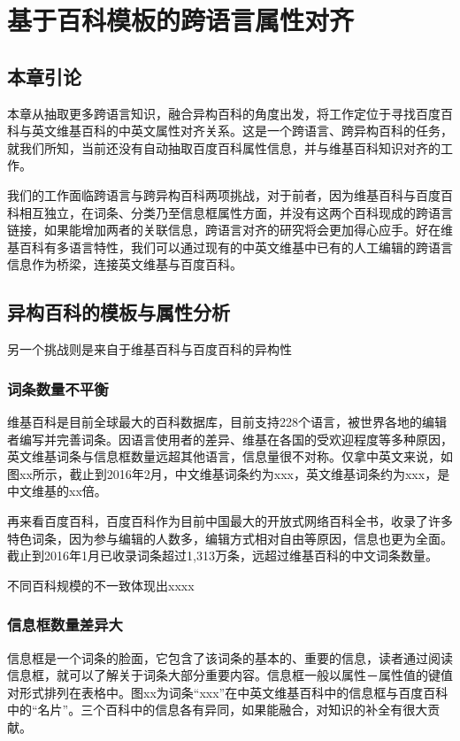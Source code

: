 \chapter{基于百科模板的跨语言属性对齐}
\label{cha:intro}

\section{本章引论}
本章从抽取更多跨语言知识，融合异构百科的角度出发，将工作定位于寻找百度百科与英文维基百科的中英文属性对齐关系。这是一个跨语言、跨异构百科的任务，就我们所知，当前还没有自动抽取百度百科属性信息，并与维基百科知识对齐的工作。

我们的工作面临跨语言与跨异构百科两项挑战，对于前者，因为维基百科与百度百科相互独立，在词条、分类乃至信息框属性方面，并没有这两个百科现成的跨语言链接，如果能增加两者的关联信息，跨语言对齐的研究将会更加得心应手。好在维基百科有多语言特性，我们可以通过现有的中英文维基中已有的人工编辑的跨语言信息作为桥梁，连接英文维基与百度百科。


\section{异构百科的模板与属性分析}

另一个挑战则是来自于维基百科与百度百科的异构性

\subsection{词条数量不平衡}

维基百科是目前全球最大的百科数据库，目前支持228个语言，被世界各地的编辑者编写并完善词条。因语言使用者的差异、维基在各国的受欢迎程度等多种原因，英文维基词条与信息框数量远超其他语言，信息量很不对称。仅拿中英文来说，如图xx所示，截止到2016年2月，中文维基词条约为xxx，英文维基词条约为xxx，是中文维基的xx倍。

再来看百度百科，百度百科作为目前中国最大的开放式网络百科全书，收录了许多特色词条，因为参与编辑的人数多，编辑方式相对自由等原因，信息也更为全面。截止到2016年1月已收录词条超过1,313万条，远超过维基百科的中文词条数量。

不同百科规模的不一致体现出xxxx

\subsection{信息框数量差异大}

信息框是一个词条的脸面，它包含了该词条的基本的、重要的信息，读者通过阅读信息框，就可以了解关于词条大部分重要内容。信息框一般以属性－属性值的键值对形式排列在表格中。图xx为词条“xxx”在中英文维基百科中的信息框与百度百科中的“名片”。三个百科中的信息各有异同，如果能融合，对知识的补全有很大贡献。

